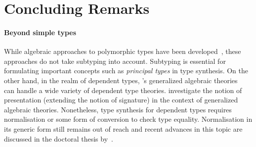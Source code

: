 
\section{Concluding Remarks} \label{sec:future}



\paragraph{Beyond simple types}
While algebraic approaches to polymorphic types have been developed~\citep{Fiore2013,Hamana2011}, these approaches do not take subtyping into account.
Subtyping is essential for formulating important concepts such as \emph{principal types} in type synthesis.
On the other hand, in the realm of dependent types, \citeauthor{Cartmell1986}'s generalized algebraic theories~\citeyearpar{Cartmell1986} can handle a wide variety of dependent type theories.
\citet{Bezem2021} investigate the notion of presentation (extending the notion of signature) in the context of generalized algebraic theories.
Nonetheless, type synthesis for dependent types requires normalisation or some form of conversion to check type equality.
Normalisation in its generic form still remains out of reach and recent advances in this topic are discussed in the doctoral thesis by~\citet{Valliappan2023}.


